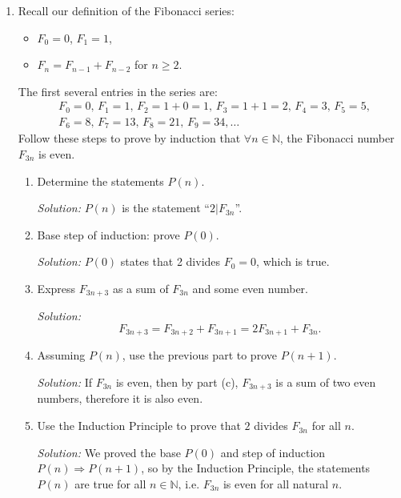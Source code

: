 \documentclass[12pt]{amsart}
\begin{document}
\begin{enumerate}[label=\arabic*.,itemsep=10pt, leftmargin=*]
    \item Recall our definition of the Fibonacci series:
    \begin{itemize}
        \item $F_0 = 0$, $F_1 = 1$,
        \item $F_{n} = F_{n-1} + F_{n-2}$ for $n\geq 2$.
    \end{itemize}
   The  first several entries in the series are:
    \begin{equation*}
    \begin{split}
    &F_0 = 0,\, F_1 = 1,\,
    F_2 = 1+0 = 1,\, F_3 = 1+1 = 2,\,
    F_4 = 3,\,
    F_5 = 5, \\
    &F_6 = 8,\,
    F_7 = 13,\,
    F_8 = 21,\,
    F_9 = 34, \dots
    \end{split}
    \end{equation*}
    Follow these steps to prove by induction that $\forall n \in \mathbb{N}$, the Fibonacci number $F_{3n}$ is even.
    \begin{enumerate}
    \item Determine the statements $P(n)$.
    
\textit{Solution:}
$P(n)$ is the statement ``$2 | F_{3n}$''.
    \item Base step of induction: prove $P(0)$.
    
\textit{Solution:}
$P(0)$ states that 2 divides $F_0 = 0$, which is true.
    \item Express $F_{3n+3}$ as a sum of $F_{3n}$ and some even number.
    
\textit{Solution:}
$$F_{3n+3} = F_{3n+2} + F_{3n+1} =
    2F_{3n+1} + F_{3n}
.$$
    \item Assuming $P(n)$, use the previous part to prove $P(n+1)$.
    
\textit{Solution:}
If $F_{3n}$ is even, then by part (c), $F_{3n+3}$ is a sum of two even numbers, therefore it is also even.
    \item Use the Induction Principle to prove that $2$ divides $F_{3n}$ for all $n$.

\textit{Solution:}
We proved the base $P(0)$ and step of induction $P(n) \Rightarrow P(n+1)$, so by the Induction Principle, the statements $P(n)$ are true for all $n\in \mathbb{N}$, i.e. $F_{3n}$ is even for all natural $n$.
    \end{enumerate}

\end{enumerate}
\end{document}
